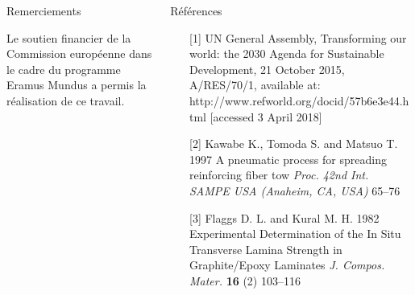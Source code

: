 \documentclass[final]{beamer}
\begin{document}
\begin{frame}

\begin{center}
\begin{minipage}{\textwidth}
\begin{columns}[totalwidth=0.925\textwidth]
\begin{column}{0.4\textwidth}
\begin{block}{\rule[-0.6ex]{0pt}{50pt}\centering Remerciements}
\centering\scriptsize Le soutien financier de la Commission europ\'eenne dans le cadre du programme Eramus Mundus a permis la r\'ealisation de ce travail.
\end{block}
\end{column}
\begin{column}{0.5\textwidth}
\begin{block}{\rule[-0.6ex]{0pt}{50pt}\centering R\'ef\'erences}
\centering
\scriptsize
\begin{enumerate}
\item[{[}1{]}] UN General Assembly, Transforming our world: the 2030 Agenda for Sustainable Development, 21 October 2015, A/RES/70/1, available at: http://www.refworld.org/docid/57b6e3e44.html [accessed 3 April 2018]
\item[{[}2{]}] Kawabe K., Tomoda S. and Matsuo T. 1997 A pneumatic process for spreading reinforcing fiber tow {\it\scriptsize Proc. 42nd Int. SAMPE USA (Anaheim, CA, USA)} 65--76
\item[{[}3{]}] Flaggs D. L. and Kural M. H. 1982 Experimental Determination of the In Situ Transverse Lamina Strength in Graphite/Epoxy Laminates {\it \scriptsize J. Compos. Mater.} {\bf \scriptsize 16} (2) 103--116

\end{enumerate}
\end{block}
\end{column}
\end{columns}
\end{minipage}
\end{center}
\end{frame}
\end{document}
